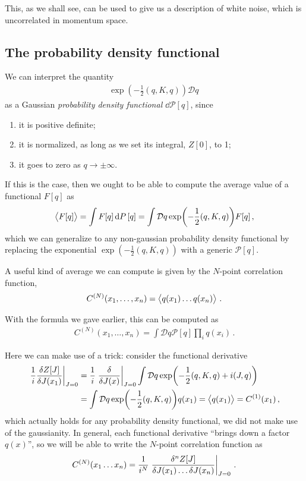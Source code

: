 \documentclass[main.tex]{subfiles}
\begin{document}
This, as we shall see, can be used to give us a description of white noise, which is uncorrelated in momentum space.

\subsection{The probability density functional}

We can interpret the quantity 
%
\begin{align}
\exp(- \frac{1}{2} (q, K, q)) \mathcal{D}q
\,
\end{align}
%
as a Gaussian \emph{probability density functional} \(\dd{\mathcal{P}}[q]\), since 
\begin{enumerate}
    \item it is positive definite;
    \item it is normalized, as long as we set its integral, \(Z[0]\), to 1;
    \item it goes to zero as \(q \to \pm \infty \).
\end{enumerate}

If this is the case, then we ought to be able to compute the average value of a functional \(F[q]\) as 
%
\begin{align} \label{eq:average-of-a-functional}
\expval{F[q]} = \int F[q] \dd{P}[q] = \int \mathcal{D}q \exp(- \frac{1}{2} (q, K, q)) F[q]  
\,,
\end{align}
%
which we can generalize to any non-gaussian probability density functional by replacing the exponential \(\exp(- \frac{1}{2} (q, K, q))\) with a generic \(\mathcal{P}[q]\).

A useful kind of average we can compute is given by the \(N\)-point correlation function, 
%
\begin{align}
C^{(N)}(x_1, \dots, x_n) = \expval{q(x_1) \dots q(x_n)}
\,.
\end{align}

With the formula we gave earlier, this can be computed as 
%
\begin{align}
C^{(N)}(x_1, \dots , x_n)
= \int \mathcal{D}q \mathcal{P}[q] \prod_i q(x_i)
\,.
\end{align}

Here we can make use of a trick: consider the functional derivative
%
\begin{align}
\eval{\frac{1}{i}\fdv{Z[J]}{J(x_1 )}}_{J = 0} &= \frac{1}{i} \eval{\fdv{}{J(x)}}_{J=0} \int \mathcal{D}q
\exp(- \frac{1}{2} (q, K, q) + i (J,q))  \\
&= \int \mathcal{D}q \exp(- \frac{1}{2} (q, K, q)) q(x_1 )
= \expval{q(x_1 )} = C^{(1)}(x_1 )
\,,
\end{align}
%
which actually holds for any probability density functional, we did not make use of the gaussianity.
In general, each functional derivative ``brings down a factor \(q(x)\)'', so we will be able to write the \(N\)-point correlation function as
%
\begin{align}
C^{(N)} (x_1 \dots x_n) = \frac{1}{i^{N}} \eval{\frac{ \delta^{n} Z[J]}{ \delta J(x_1 )\dots \delta J(x_n)}}_{J =0 }
\,.
\end{align}
\end{document}
